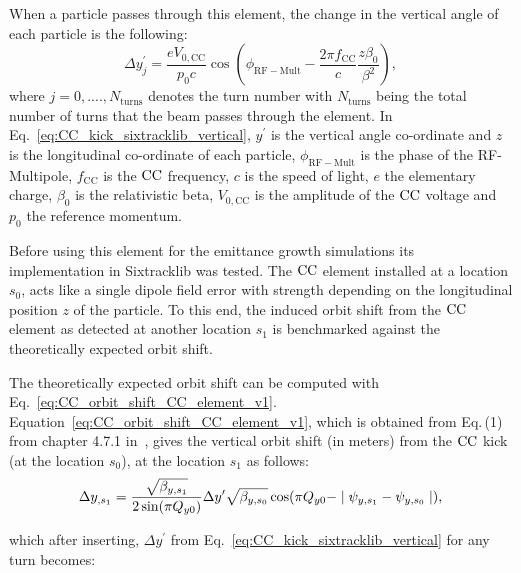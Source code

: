When a particle passes through this element, the change in the vertical angle of each particle is the following:
\begin{equation}\label{eq:CC_kick_sixtracklib_vertical}
    \Delta y^\prime_{j} =  \frac{e V_\mathrm{0,CC}}{p_0 c} \cos{\left ( \phi_\mathrm{RF-Mult} - \frac{2\pi f_\mathrm{CC}}{c} \frac{z \beta_0}{\beta^2} \right )},
\end{equation}
where $j={0, ...., N_\mathrm{turns}}$ denotes the turn number with $N_\mathrm{turns}$ being the total number of turns that the beam passes through the element. In Eq.~\eqref{eq:CC_kick_sixtracklib_vertical}, $y^\prime$ is the vertical angle co-ordinate and $z$ is the longitudinal co-ordinate of each particle, $\phi_\mathrm{RF-Mult}$ is the phase of the RF-Multipole, $f_\mathrm{CC}$ is the ${\mathrm{CC}}$ frequency, $c$ is the speed of light, $e$ the elementary charge, $\beta_0$ is the relativistic beta, $V_\mathrm{0,CC}$ is the amplitude of the ${\mathrm{CC}}$ voltage and $p_0$ the reference momentum.

Before using this element for the emittance growth simulations its implementation in Sixtracklib was tested. %
The ${\mathrm{CC}}$ element installed at a location $s_0$, acts like a single dipole field error with strength depending on the longitudinal position $z$ of the particle. To this end, the induced orbit shift from the ${\mathrm{CC}}$ element as detected at another location $s_1$ is benchmarked against the theoretically expected orbit shift. %

The theoretically expected orbit shift can be computed with Eq.~\eqref{eq:CC_orbit_shift_CC_element_v1}. Equation~\eqref{eq:CC_orbit_shift_CC_element_v1}, which is obtained from Eq.\,(1) from chapter 4.7.1 in~\cite{Chao:1490001}, gives the vertical orbit shift (in meters) from the ${\mathrm{CC}}$ kick (at the location $s_0$), at the location $s_1$ as follows:
\begin{equation}\label{eq:CC_orbit_shift_CC_element_v1}
    \Delta y_{,s_1} = \frac{\sqrt{\beta_{y, s_1}}}{2 \sin(\pi {Q_{y0}})} \Delta y^\prime \sqrt{\beta_{y, s_0}} \cos(\pi {Q_{y0}} - \mid \psi_{y, s_1} - \psi_{y, s_0} \mid),
 \end{equation}

which after inserting, $\Delta y^\prime$ from Eq.~\eqref{eq:CC_kick_sixtracklib_vertical} for any turn becomes:

